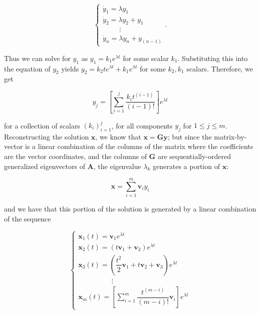 \begin{equation}\left\{\begin{array}{l} \dot{y}_1 = \lambda y_1 \\[3mm] \dot{y}_2 = \lambda y_2 + y_1 \\[3mm] \hspace{1cm}\vdots \\[3mm] \dot{y}_{n} = \lambda y_n + y_{(n-1)} \end{array}\right. .\end{equation}

	Thus we can solve for $y_1$ as $y_1 = k_1e^{\lambda t}$ for some scalar $k_1$. Substituting this into the equation of $y_2$ yields $y_2 = k_2te^{\lambda t} + k_1e^{\lambda t}$ for some $k_2,k_1$ scalars. Therefore, we get

\begin{equation} y_j = \left[\displaystyle\sum\limits_{i=1}^{j} \dfrac{k_it^{(i-1)}}{(i-1)!}\right] e^{\lambda t} \end{equation}

	\noindent for a collection of scalars $\left(k_i\right)_{i=1}^j$, for all components $y_j$ for $1\leq j\leq m$. Reconstructing the solution $\mathbf{x}$, we know that $\mathbf{x = Gy}$; but since the matrix-by-vector is a linear combination of the columns of the matrix where the coefficients are the vector coordinates, and the columns of $\mathbf{G}$ are sequentially-ordered generalized eigenvectors of $\mathbf{A}$, the eigenvalue $\lambda_k$ generates a portion of $\mathbf{x}$:

\begin{equation} \mathbf{x} = \sum_{i=1}^m \mathbf{v}_iy_i \end{equation}

	\noindent and we have that this portion of the solution is generated by a linear combination of the sequence

\begin{equation}
\left\{\begin{array}{l}
	\mathbf{x}_1(t) = \mathbf{v}_1 e^{\lambda t} \\[3mm]
	\mathbf{x}_2(t) = \left(t\mathbf{v}_1 + \mathbf{v}_2\right) e^{\lambda t} \\[3mm]
	\mathbf{x}_3(t) = \left(\dfrac{t^2}{2}\mathbf{v}_1 + t\mathbf{v}_2 + \mathbf{v}_3\right) e^{\lambda t} \\[3mm]
	\hspace{2cm} \vdots \\[3mm]
	\mathbf{x}_m(t) = \left[\displaystyle\sum\limits_{i=1}^{m} \dfrac{t^{(m-i)}}{(m-i)!}\mathbf{v}_i \right] e^{\lambda t}
\end{array}\right. \label{eq:jordan_chain_sols_seq}
\end{equation}

